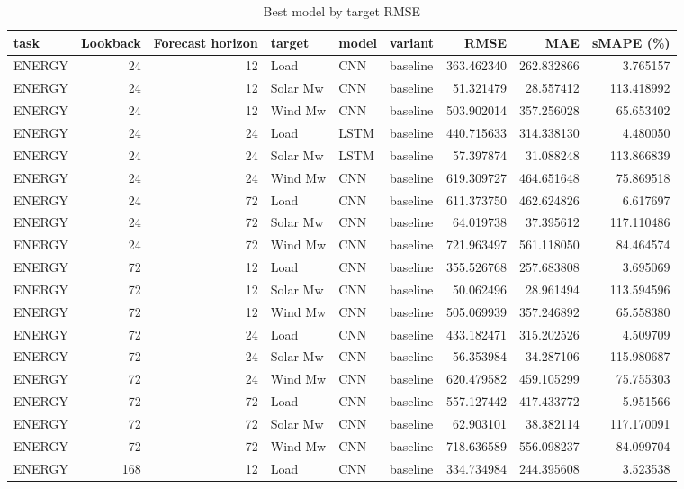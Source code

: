 \begin{table}
\caption{Best model by target RMSE}
\begin{tabular}{lrrlllrrr}
\toprule
task & Lookback & Forecast horizon & target & model & variant & RMSE & MAE & sMAPE (\%) \\
\midrule
ENERGY & 24 & 12 & Load & CNN & baseline & 363.462340 & 262.832866 & 3.765157 \\
ENERGY & 24 & 12 & Solar Mw & CNN & baseline & 51.321479 & 28.557412 & 113.418992 \\
ENERGY & 24 & 12 & Wind Mw & CNN & baseline & 503.902014 & 357.256028 & 65.653402 \\
ENERGY & 24 & 24 & Load & LSTM & baseline & 440.715633 & 314.338130 & 4.480050 \\
ENERGY & 24 & 24 & Solar Mw & LSTM & baseline & 57.397874 & 31.088248 & 113.866839 \\
ENERGY & 24 & 24 & Wind Mw & CNN & baseline & 619.309727 & 464.651648 & 75.869518 \\
ENERGY & 24 & 72 & Load & CNN & baseline & 611.373750 & 462.624826 & 6.617697 \\
ENERGY & 24 & 72 & Solar Mw & CNN & baseline & 64.019738 & 37.395612 & 117.110486 \\
ENERGY & 24 & 72 & Wind Mw & CNN & baseline & 721.963497 & 561.118050 & 84.464574 \\
ENERGY & 72 & 12 & Load & CNN & baseline & 355.526768 & 257.683808 & 3.695069 \\
ENERGY & 72 & 12 & Solar Mw & CNN & baseline & 50.062496 & 28.961494 & 113.594596 \\
ENERGY & 72 & 12 & Wind Mw & CNN & baseline & 505.069939 & 357.246892 & 65.558380 \\
ENERGY & 72 & 24 & Load & CNN & baseline & 433.182471 & 315.202526 & 4.509709 \\
ENERGY & 72 & 24 & Solar Mw & CNN & baseline & 56.353984 & 34.287106 & 115.980687 \\
ENERGY & 72 & 24 & Wind Mw & CNN & baseline & 620.479582 & 459.105299 & 75.755303 \\
ENERGY & 72 & 72 & Load & CNN & baseline & 557.127442 & 417.433772 & 5.951566 \\
ENERGY & 72 & 72 & Solar Mw & CNN & baseline & 62.903101 & 38.382114 & 117.170091 \\
ENERGY & 72 & 72 & Wind Mw & CNN & baseline & 718.636589 & 556.098237 & 84.099704 \\
ENERGY & 168 & 12 & Load & CNN & baseline & 334.734984 & 244.395608 & 3.523538 \\

\end{tabular}
\end{table}
